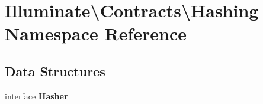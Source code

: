 \section{Illuminate\textbackslash{}Contracts\textbackslash{}Hashing Namespace Reference}
\label{namespace_illuminate_1_1_contracts_1_1_hashing}
\subsection*{Data Structures}
\begin{DoxyCompactItemize}
\item 
interface {\bf Hasher}
\end{DoxyCompactItemize}
